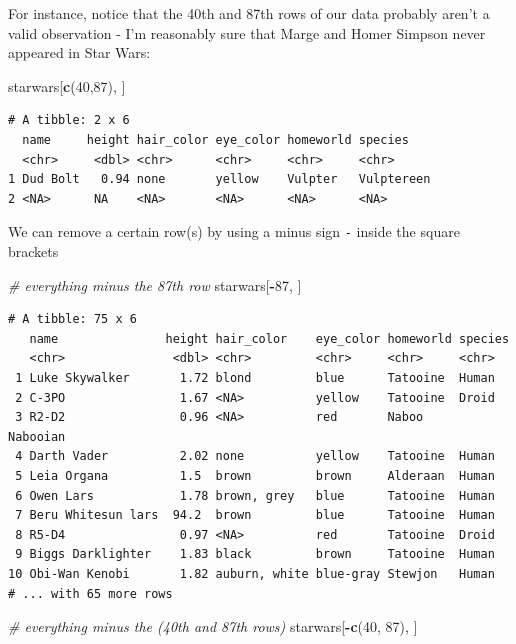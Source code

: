 \documentclass[]{book}
\newenvironment{Shaded}{\begin{snugshade}}{\end{snugshade}}
\newcommand{\CommentTok}[1]{\textcolor[rgb]{0.56,0.35,0.01}{\textit{#1}}}
\newcommand{\DecValTok}[1]{\textcolor[rgb]{0.00,0.00,0.81}{#1}}
\newcommand{\KeywordTok}[1]{\textcolor[rgb]{0.13,0.29,0.53}{\textbf{#1}}}
\newcommand{\NormalTok}[1]{#1}
\newcommand{\OperatorTok}[1]{\textcolor[rgb]{0.81,0.36,0.00}{\textbf{#1}}}
\begin{document}
For instance, notice that the 40th and 87th rows of our data probably aren't a valid observation - I'm reasonably sure that Marge and Homer Simpson never appeared in Star Wars:

\begin{Shaded}
\begin{Highlighting}[]
\NormalTok{starwars[}\KeywordTok{c}\NormalTok{(}\DecValTok{40}\NormalTok{,}\DecValTok{87}\NormalTok{), ]}
\end{Highlighting}
\end{Shaded}

\begin{verbatim}
# A tibble: 2 x 6
  name     height hair_color eye_color homeworld species   
  <chr>     <dbl> <chr>      <chr>     <chr>     <chr>     
1 Dud Bolt   0.94 none       yellow    Vulpter   Vulptereen
2 <NA>      NA    <NA>       <NA>      <NA>      <NA>      
\end{verbatim}

We can remove a certain row(s) by using a minus sign \texttt{-} inside the square brackets

\begin{Shaded}
\begin{Highlighting}[]
\CommentTok{# everything minus the 87th row}
\NormalTok{starwars[}\OperatorTok{-}\DecValTok{87}\NormalTok{, ]}
\end{Highlighting}
\end{Shaded}

\begin{verbatim}
# A tibble: 75 x 6
   name               height hair_color    eye_color homeworld species 
   <chr>               <dbl> <chr>         <chr>     <chr>     <chr>   
 1 Luke Skywalker       1.72 blond         blue      Tatooine  Human   
 2 C-3PO                1.67 <NA>          yellow    Tatooine  Droid   
 3 R2-D2                0.96 <NA>          red       Naboo     Nabooian
 4 Darth Vader          2.02 none          yellow    Tatooine  Human   
 5 Leia Organa          1.5  brown         brown     Alderaan  Human   
 6 Owen Lars            1.78 brown, grey   blue      Tatooine  Human   
 7 Beru Whitesun lars  94.2  brown         blue      Tatooine  Human   
 8 R5-D4                0.97 <NA>          red       Tatooine  Droid   
 9 Biggs Darklighter    1.83 black         brown     Tatooine  Human   
10 Obi-Wan Kenobi       1.82 auburn, white blue-gray Stewjon   Human   
# ... with 65 more rows
\end{verbatim}

\begin{Shaded}
\begin{Highlighting}[]
\CommentTok{# everything minus the (40th and 87th rows)}
\NormalTok{starwars[}\OperatorTok{-}\KeywordTok{c}\NormalTok{(}\DecValTok{40}\NormalTok{, }\DecValTok{87}\NormalTok{), ]}
\end{Highlighting}
\end{Shaded}
\end{document}
